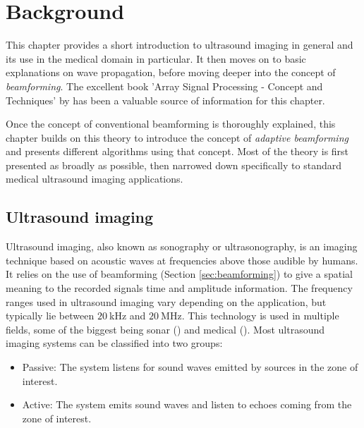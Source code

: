 \chapter{Background}
\label{chap:background}

This chapter provides a short introduction to ultrasound imaging in general and its use in the medical domain in particular. It then moves on to basic explanations on wave propagation, before moving deeper into the concept of \textit{beamforming}.
The excellent book 'Array Signal Processing - Concept and Techniques' by \cite{Dudgeon_book} has been a valuable source of information for this chapter.

Once the concept of conventional beamforming is thoroughly explained, this chapter builds on this theory to introduce the concept of \textit{adaptive beamforming} and presents different algorithms using that concept.
Most of the theory is first presented as broadly as possible, then narrowed down specifically to standard medical ultrasound imaging applications.


\section{Ultrasound imaging}
\label{sec:ultrasound_imaging}
Ultrasound imaging, also known as sonography or ultrasonography, is an imaging technique based on acoustic waves at frequencies above those audible by humans. It relies on the use of beamforming (Section \ref{sec:beamforming}) to give a spatial meaning to the recorded signals time and amplitude information. The frequency ranges used in ultrasound imaging vary depending on the application, but typically lie between $20~$kHz and $20~$MHz. This technology is used in multiple fields, some of the biggest being sonar (\cite{sonar}) and medical (\cite{medical_physics}).
Most ultrasound imaging systems can be classified into two groups:
\begin{itemize}
\item Passive: The system listens for sound waves emitted by sources in the zone of interest.
\item Active: The system emits sound waves and listen to echoes coming from the zone of interest.
\label{item:systems}
\end{itemize}

